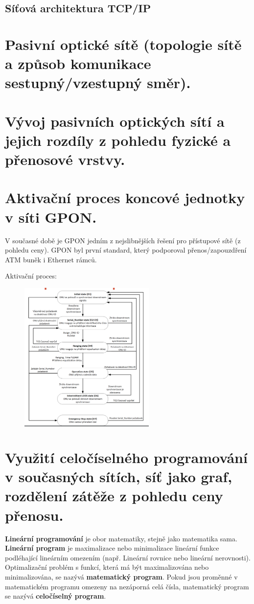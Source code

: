 \subsection{Síťová architektura TCP/IP}


\newpage
\section{Pasivní optické sítě (topologie sítě a způsob komunikace sestupný/vzestupný směr).}

\newpage
\section{Vývoj pasivních optických sítí a jejich rozdíly z pohledu fyzické a přenosové vrstvy.}

\newpage
\section{Aktivační proces koncové jednotky v síti GPON.}
V současné době je GPON jedním z nejslibnějších řešení pro přístupové sítě (z pohledu ceny). GPON byl první standard, který podporoval přenos/zapouzdření ATM buněk i Ethernet rámců. 

Aktivační proces:
\begin{figure} [h]
    \centering
    \includegraphics[width=0.6\textwidth]{snimky/proces.png}
    \label{fig:uml}
\end{figure}


\newpage
\section{Využití celočíselného programování v současných sítích, síť jako graf, rozdělení zátěže z pohledu ceny přenosu.}
\textbf{Lineární programování} je obor matematiky, stejně jako matematika sama. \textbf{Lineární program} je maximalizace nebo minimalizace lineární funkce podléhající lineárním omezením (např. Lineární rovnice nebo lineární nerovnosti). Optimalizační problém s funkcí, která má být maximalizována nebo minimalizována, se nazývá \textbf{matematický program}. Pokud jsou proměnné v matematickém programu omezeny na nezáporná celá čísla, matematický program se nazývá \textbf{celočíselný program}.

